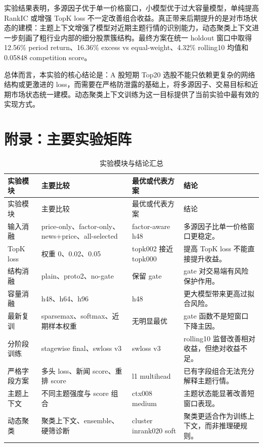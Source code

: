 \documentclass[UTF8,a4paper,12pt,fontset=none]{ctexart}
\begin{document}
实验结果表明，多源因子优于单一价格窗口，小模型优于过大容量模型，单纯提高 RankIC 或增强 TopK loss 不一定改善组合收益。真正带来后期提升的是对市场状态的建模：主题上下文增强了模型对近期主题行情的识别能力，动态聚类上下文进一步刻画了粗行业内部的细分股票簇结构。最终方案在统一 holdout 窗口中取得 12.56\% period return、16.36\% excess vs equal-weight、4.32\% rolling10 均值和 0.05848 competition score。

总体而言，本实验的核心结论是：A 股短期 Top20 选股不能只依赖更复杂的网络结构或更激进的 loss，而需要在严格防泄露的基础上，将多源因子、交易目标和近期市场状态统一建模。动态聚类上下文训练为这一目标提供了当前实验中最有效的实现方式。

\appendix

\section{附录：主要实验矩阵}

\small
\begin{longtable}{L{0.15\textwidth}L{0.23\textwidth}L{0.18\textwidth}L{0.25\textwidth}}
  \caption{实验模块与结论汇总} \\
  \toprule
  实验模块 & 主要比较 & 最优或代表方案 & 结论 \\
  \midrule
  \endfirsthead
  \toprule
  实验模块 & 主要比较 & 最优或代表方案 & 结论 \\
  \midrule
  \endhead
  输入消融 & price-only、factor-only、news+price、all-selected & factor-aware h48 & 多源因子比单一价格窗口更稳定。 \\
  TopK loss & 权重 0、0.02、0.05 & topk002 接近 topk000 & 提高 TopK loss 不能直接提升收益。 \\
  结构消融 & plain、proto2、no-gate & 保留 gate & gate 对交易端有风险保护作用。 \\
  容量消融 & h48、h64、h96 & h48 & 更大模型带来更高过拟合风险。 \\
  最新复训 & sparsemax、softmax、近期样本权重 & 无明显最优 & gate 函数不是短窗口下降主因。 \\
  分阶段训练 & stagewise final、swloss v3 & swloss v3 & rolling10 监督改善相对收益，但绝对收益不足。 \\
  严格字段方案 & 多头 loss、新闻 score、重排 score & l1 multihead & 已有字段组合无法充分解释主题行情。 \\
  主题上下文 & 不同主题强度与 score 组合 & ctx008 medium & 主题状态能显著改善短窗口表现。 \\
  动态聚类 & 聚类上下文、ensemble、硬筛诊断 & cluster inrank020 soft & 聚类更适合作为训练上下文，而非推理硬规则。 \\
  \bottomrule
\end{longtable}
\normalsize
\end{document}
